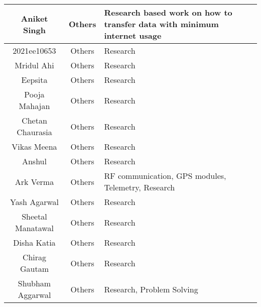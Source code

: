 \begin{center}
\begin{longtable}{ | c | c | m{6cm} | }
        \hline
        Aniket Singh               & Others            & Research based work on how to transfer data with minimum internet usage \\
        \hline
        2021ee10653                & Others            & Research                                                                \\
        \hline
        Mridul Ahi                 & Others            & Research                                                                \\
        \hline
        Eepsita                    & Others            & Research                                                                \\
        \hline
        Pooja Mahajan              & Others            & Research                                                                \\
        \hline
        Chetan Chaurasia           & Others            & Research                                                                \\
        \hline
        Vikas Meena                & Others            & Research                                                                \\
        \hline
        Anshul                     & Others            & Research                                                                \\
        \hline
        Ark Verma                  & Others            & RF communication, \ac{GPS} modules, Telemetry, Research                 \\
        \hline
        Yash Agarwal               & Others            & Research                                                                \\
        \hline
        Sheetal Manatawal          & Others            & Research                                                                \\
        \hline
        Disha Katia                & Others            & Research                                                                \\
        \hline
        Chirag Gautam              & Others            & Research                                                                \\
        \hline
        Shubham Aggarwal           & Others            & Research, Problem Solving                                               \\

\end{longtable}
\end{center}
